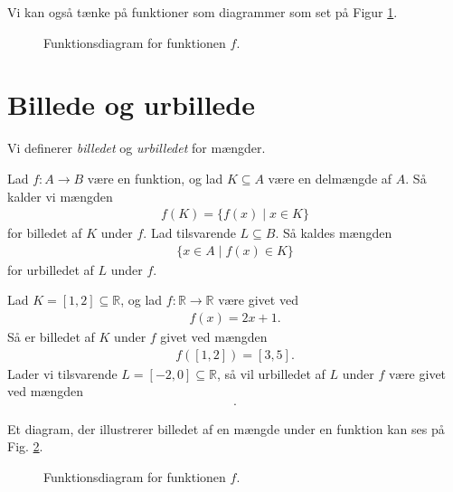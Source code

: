 Vi kan også tænke på funktioner som diagrammer som set på Figur \ref{fig:diag}.
\begin{figure}[H]
	\centering
	\caption{Funktionsdiagram for funktionen $f$.}
	\label{fig:diag}
\end{figure}

\section*{Billede og urbillede}
Vi definerer \textit{billedet} og \textit{urbilledet} for mængder.
\begin{defn}
Lad $f:A \to B$ være en funktion, og lad $K\subseteq A$ være en delmængde af $A$. Så kalder vi mængden
\begin{align*}
f(K) = \{f(x) \mid x \in K\}
\end{align*}
for billedet af $K$ under $f$. 
Lad tilsvarende $L\subseteq B$. Så kaldes mængden 
\begin{align*}
 \{x \in A \mid f(x) \in K\}
\end{align*}
for urbilledet af $L$ under $f$.
\end{defn}

\begin{exa}
Lad $K = [1,2]\subseteq \mathbb{R}$, og lad $f:\mathbb{R} \to \mathbb{R}$ være givet ved
\begin{align*}
f(x) = 2x+1.
\end{align*}
Så er billedet af $K$ under $f$ givet ved mængden 
\begin{align*}
f([1,2]) = [3,5].
\end{align*}
Lader vi tilsvarende $L = [-2,0] \subseteq \mathbb{R}$, så vil urbilledet af $L$ under $f$ være givet ved mængden
\begin{align*}
[-1.5, -0.5].
\end{align*}
\end{exa}

Et diagram, der illustrerer billedet af en mængde under en funktion kan ses på Fig. \ref{fig:im}.
\begin{figure}[H]
	\centering
	\caption{Funktionsdiagram for funktionen $f$.}
	\label{fig:im}
\end{figure}


